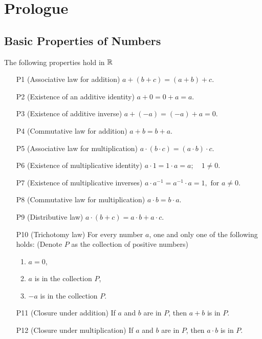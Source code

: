 \section{Prologue}
\subsection{Basic Properties of Numbers}
\begin{defi} The following properties hold in $\mathbb{R}$
    
     \begin{itemize}
         \item[P1](Associative law for addition) \hfill $a+(b+c) = (a+b)+c$.
         \item[P2](Existence of an additive identity) \hfill $a+0=0+a=a$.
         \item[P3](Existence of additive inverse) \hfill $a+(-a)=(-a)+a=0 $.
         \item[P4](Commutative law for addition) \hfill $a+b=b+a$.
         \item[P5](Associative law for multiplication) \hfill $a\cdot(b\cdot c)
         = (a\cdot b)\cdot c$.
         \item[P6](Existence of multiplicative identity) \hfill $a\cdot 1 =
         1\cdot a = a;\quad 1 \neq 0$.
         \item[P7](Existence of multiplicative inverses) \hfill $a\cdot a^{-1} =
         a^{-1}\cdot a = 1,\text{ for } a \neq 0$.
         \item[P8](Commutative law for multiplication) \hfill $a\cdot b = b\cdot a$.
         \item[P9](Distributive law) \hfill $a\cdot(b+c) = a\cdot b+ a\cdot c$.
         \item[P10](Trichotomy law) For every number $a$, one and only one of
         the following holds: (Denote $P$ as the collection of positive numbers)
            \begin{enumerate}
                \item $a=0$,
                \item $a $ is in the collection $P$,
                \item $-a $ is in the collection $P$.
            \end{enumerate}
        \item[P11](Closure under addition) If $a $ and $ b $ are in $ P $, then
        $a+b$ is in $P$.
        \item[P12](Closure under multiplication) If $a$ and $b$ are in $P$, then
        $a\cdot b$ is in $P$.
     \end{itemize}
\end{defi}
